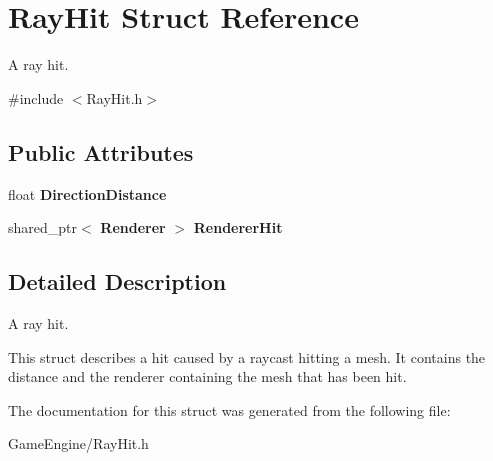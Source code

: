 \section{Ray\+Hit Struct Reference}
\label{struct_ray_hit}


A ray hit.  




{\ttfamily \#include $<$Ray\+Hit.\+h$>$}

\subsection*{Public Attributes}
\begin{DoxyCompactItemize}
\item 
\mbox{\label{struct_ray_hit_adf0ff13ef8198b9367a252046e77f6c8}} 
float {\bfseries Direction\+Distance}
\item 
\mbox{\label{struct_ray_hit_a835a3758044689de6d62f960f5e5e102}} 
shared\+\_\+ptr$<$ \textbf{ Renderer} $>$ {\bfseries Renderer\+Hit}
\end{DoxyCompactItemize}


\subsection{Detailed Description}
A ray hit. 

This struct describes a hit caused by a raycast hitting a mesh. It contains the distance and the renderer containing the mesh that has been hit. 

The documentation for this struct was generated from the following file\+:\begin{DoxyCompactItemize}
\item 
Game\+Engine/Ray\+Hit.\+h\end{DoxyCompactItemize}
